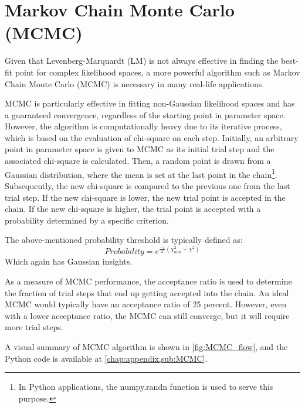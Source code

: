 \documentclass[12pt, TexShade, letterpaper]{report}
\begin{document}
\section{Markov Chain Monte Carlo (MCMC)}
Given that Levenberg-Marquardt (LM) is not always effective in finding the best-fit point for complex likelihood spaces, a more powerful algorithm such as Markov Chain Monte Carlo (MCMC) is necessary in many real-life applications. \par
MCMC is particularly effective in fitting non-Gaussian likelihood spaces and has a guaranteed convergence, regardless of the starting point in parameter space. However, the algorithm is computationally heavy due to its iterative process, which is based on the evaluation of chi-square on each step. Initially, an arbitrary point in parameter space is given to MCMC as its initial trial step and the associated chi-square is calculated. Then, a random point is drawn from a Gaussian distribution, where the mean is set at the last point in the chain\footnote{In Python applications, the numpy.randn function is used to serve this purpose.}. Subsequently, the new chi-square is compared to the previous one from the last trial step. If the new chi-square is lower, the new trial point is accepted in the chain. If the new chi-square is higher, the trial point is accepted with a probability determined by a specific criterion.\par
The above-mentioned probability threshold is typically defined as:
\begin{equation}
    Probability = e^{\frac{-1}{2}(\chi_{new}^2 - \chi^2)}
\end{equation}
Which again has Gaussian insights.\par
As a measure of MCMC performance, the acceptance ratio is used to determine the fraction of trial steps that end up getting accepted into the chain. An ideal MCMC would typically have an acceptance ratio of 25 percent. However, even with a lower acceptance ratio, the MCMC can still converge, but it will require more trial steps.\par
A visual summary of MCMC algorithm is shown in \ref{fig:MCMC_flow}, and the Python code is available at \ref{chap:appendix,sub:MCMC}.
\end{document}
